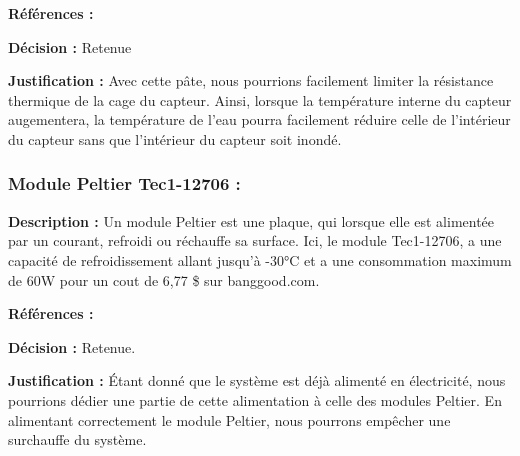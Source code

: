 \textbf{Références :} \cite{pate1} \cite{pate2}

\textbf{Décision :} Retenue

\textbf{Justification :} Avec cette pâte, nous pourrions facilement limiter la résistance thermique de la cage du capteur. Ainsi, lorsque la température interne du capteur augementera, la température de l'eau pourra facilement réduire celle de l'intérieur du capteur sans que l'intérieur du capteur soit inondé. 

\subsubsection{Module Peltier Tec1-12706 :}
\textbf{Description :} Un module Peltier est une plaque, qui lorsque elle est alimentée par un courant, refroidi ou réchauffe sa surface. Ici, le module Tec1-12706, a une capacité de refroidissement allant jusqu'à -30°C et a une consommation maximum de 60W pour un cout de 6,77 \$ sur banggood.com. 

\textbf{Références :} \cite{pel1} \cite{pel2}

\textbf{Décision :} Retenue.

\textbf{Justification :} Étant donné que le système est déjà alimenté en électricité, nous pourrions dédier une partie de cette alimentation à celle des modules Peltier. En alimentant correctement le module Peltier, nous pourrons empêcher une surchauffe du système.

\begin{table}[!htb]
\footnotesize
\centering
{}
\end{table}


